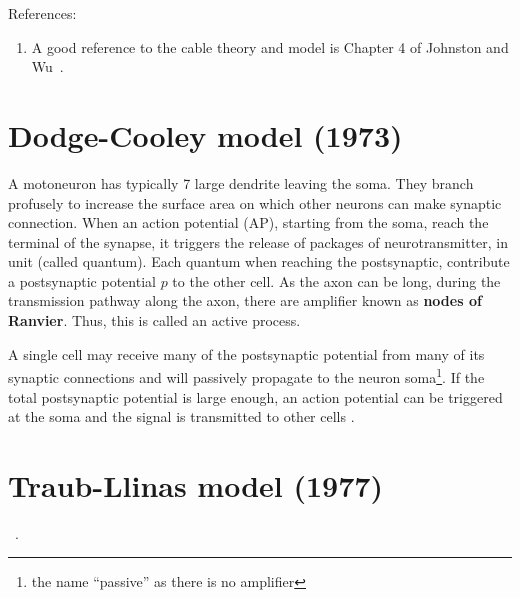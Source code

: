 

References:
\begin{enumerate}
\item A good reference to the cable theory and model is Chapter 4 of
  Johnston and Wu~\citep{johnston1994fcn}.
\end{enumerate}

\section{Dodge-Cooley model (1973)}
\label{sec:dodge-cooley-model}

A motoneuron has typically 7 large dendrite leaving the soma. They
branch profusely to increase the surface area on which other neurons
can make synaptic connection. When an action potential (AP), starting
from the soma, reach the terminal of the synapse, it triggers the
release of packages of neurotransmitter, in unit (called
quantum). Each quantum when reaching the postsynaptic, contribute a
postsynaptic potential $p$ to the other cell.  As the axon can be
long, during the transmission pathway along the axon, there are
amplifier known as {\bf nodes of Ranvier}. Thus, this is called an
active process.


A single cell may receive many of the postsynaptic potential from many
of its synaptic connections and will passively propagate to the neuron
soma\footnote{the name ``passive'' as there is no amplifier}. If the
total postsynaptic potential is large enough, an action potential can
be triggered at the soma and the signal is transmitted to other cells
\citep{dodge1973apm}.

\section{Traub-Llinas model (1977)}
\label{sec:Traub-Llinas-1977}

~\citep{traub1977sdi}. 


